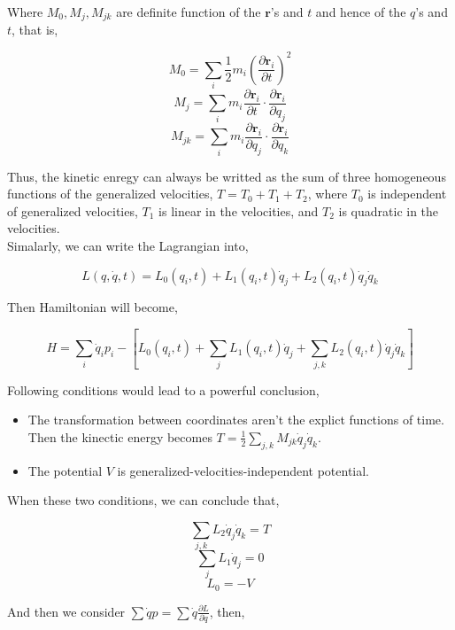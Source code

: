 \documentclass[12pt]{article}
\begin{document}
Where $M_0, M_j, M_{jk}$ are definite function of the $\mathbf{r}$'s and $t$ and hence of the $q$'s and $t$, that is, 

\begin{center}
    \[ M_0 = \sum_{i}{\frac{1}{2}m_i\left(\frac{\partial \mathbf{r}_i}{\partial t}\right)^2} \]
    \[ M_j = \sum_{i}{m_i \frac{\partial \mathbf{r}_i}{\partial t} \cdot \frac{\partial \mathbf{r}_i}{\partial q_j}} \]
    \[ M_{jk} = \sum_{i}{m_i \frac{\partial \mathbf{r}_i}{\partial q_j} \cdot \frac{\partial \mathbf{r}_i}{\partial q_k}} \] 
\end{center}

Thus, the kinetic enregy can always be writted as the sum of three homogeneous functions of the generalized velocities, $T = T_0 + T_1 + T_2$, where $T_0$ is independent of generalized velocities, $T_1$ is linear in the velocities, and $T_2$ is quadratic in the velocities.
\\
Simalarly, we can write the Lagrangian into,

\begin{center}
    \[ L(q, \dot{q}, t) = L_0(q_i, t) + L_1(q_i, t) \dot{q}_j + L_2(q_i, t)\dot{q}_j\dot{q}_k \]
\end{center}

Then Hamiltonian will become,

\begin{center}
    \[ H = \sum_i{\dot{q}_i p_i} - \left[ L_0(q_i, t) + \sum_{j}{L_1(q_i, t) \dot{q}_j} + \sum_{j,k}{L_2(q_i, t)\dot{q}_j\dot{q}_k}\right]\]
\end{center}

Following conditions would lead to a powerful conclusion,

\begin{itemize}
    \item The transformation between coordinates aren't the explict functions of time. Then the kinectic energy becomes $T = \frac{1}{2}\sum_{j, k}{M_{jk}\dot{q}_j\dot{q}_k}$.
    \item The potential $V$ is generalized-velocities-independent potential.
\end{itemize}

When these two conditions, we can conclude that,
\begin{center}
    \[ \sum_{j, k}{L_2\dot{q}_j\dot{q}_k} = T \]
    \[ \sum_{j}{L_1\dot{q}_j} = 0 \]
    \[ L_0 = -V \]
\end{center} 

And then we consider $\sum{\dot{q}p} = \sum{\dot{q}\frac{\partial L}{\partial \dot{q}}}$, then,
\end{document}
